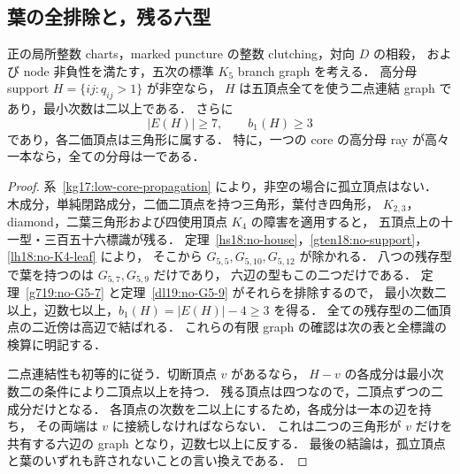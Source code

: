 \subsection{葉の全排除と，残る六型}
\label{sf19:section}

\begin{corollary}[非空支持は二点連結で最小次数二以上]
\label{sf19:no-leaves}
正の局所整数 charts，marked puncture の整数 clutching，対向 $D$ の相殺，
および node 非負性を満たす，五次の標準 $K_5$ branch graph を考える．
高分母 support $H=\{ij:q_{ij}>1\}$ が非空なら，
$H$ は五頂点全てを使う二点連結 graph であり，最小次数は二以上である．
さらに
\[
 |E(H)|\ge7,\qquad b_1(H)\ge3
\]
であり，各二価頂点は三角形に属する．
特に，一つの core の高分母 ray が高々一本なら，全ての分母は一である．
\end{corollary}

\begin{proof}
系~\ref{kg17:low-core-propagation} により，非空の場合に孤立頂点はない．
木成分，単純閉路成分，二価二頂点を持つ三角形，葉付き四角形，
$K_{2,3}$，diamond，二葉三角形および四使用頂点 $K_4$ の障害を適用すると，
五頂点上の十一型・三百五十六標識が残る．
定理~\ref{hs18:no-house}，\ref{gten18:no-support}，\ref{lh18:no-K4-leaf} により，
そこから $G_{5,5},G_{5,10},G_{5,12}$ が除かれる．
八つの残存型で葉を持つのは $G_{5,7},G_{5,9}$ だけであり，
六辺の型もこの二つだけである．
定理~\ref{g719:no-G5-7} と定理~\ref{dl19:no-G5-9} がそれらを排除するので，
最小次数二以上，辺数七以上，$b_1(H)=|E(H)|-4\ge3$ を得る．
全ての残存型の二価頂点の二近傍は高辺で結ばれる．
これらの有限 graph の確認は次の表と全標識の検算に明記する．

二点連結性も初等的に従う．切断頂点 $v$ があるなら，
$H-v$ の各成分は最小次数二の条件により二頂点以上を持つ．
残る頂点は四つなので，二頂点ずつの二成分だけとなる．
各頂点の次数を二以上にするため，各成分は一本の辺を持ち，
その両端は $v$ に接続しなければならない．
これは二つの三角形が $v$ だけを共有する六辺の graph となり，辺数七以上に反する．
最後の結論は，孤立頂点と葉のいずれも許されないことの言い換えである．
\end{proof}

